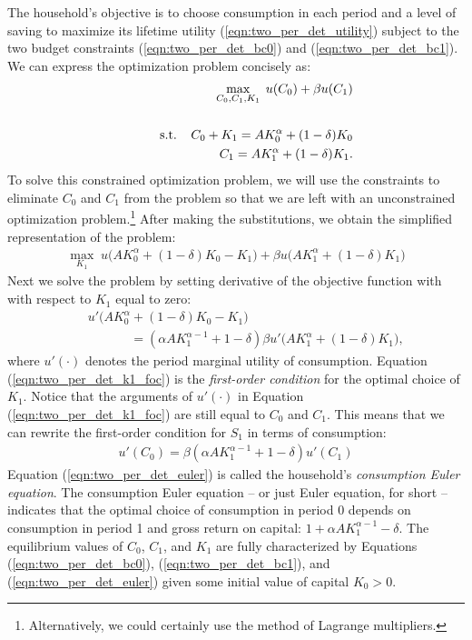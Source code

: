 \documentclass[12pt,fleqn]{article}
\newcommand{\EE}{\begin{eqnarray}}
\newcommand{\FF}{\end{eqnarray}}
\newcommand{\tn}{\textnormal}
\begin{document}
The household's objective is to choose consumption in each period and a level of saving to maximize its lifetime utility (\ref{eqn:two_per_det_utility}) subject to the two budget constraints (\ref{eqn:two_per_det_bc0}) and (\ref{eqn:two_per_det_bc1}). We can express the optimization problem concisely as:
	\EE
	&&\max_{C_0,C_1,K_1} \; u(C_0) + \beta u(C_1)\\\nonumber\\
	&& \; \; \; \;  \; \; \; \; \tn{s.t.} \; \; \; \; C_0 + K_1 = A K_0^{\alpha}  + (1-\delta)K_0\nonumber\\
	&&\; \; \; \; \; \; \; \; \; \; \; \; \; \; \; \; \; C_1 = A K_1^{\alpha}  + (1-\delta)K_1.\nonumber
	\FF
To solve this constrained optimization problem, we will use the constraints to eliminate $C_0$ and $C_1$ from the problem so that we are left with an unconstrained optimization problem.\footnote{Alternatively, we could certainly use the method of Lagrange multipliers.} After making the substitutions, we obtain the simplified representation of the problem:
	\EE
	\max_{K_1} \; u\Big( A K_0^{\alpha}  + (1-\delta)K_0 - K_1 \Big) + \beta u\Big( A K_1^{\alpha}  + (1-\delta)K_1 \Big)
	\FF
Next we solve the problem by setting derivative of the objective function with with respect to $K_1$ equal to zero:
	\EE
	&& u'\Big( A K_0^{\alpha}  + (1-\delta)K_0 - K_1 \Big) \nonumber \\
	&& \; \; \; \; \; \; \; \; \; \; \; \; = \left( \alpha AK_1^{\alpha-1} + 1-\delta\right) \beta u'\Big( A K_1^{\alpha}  + (1-\delta)K_1 \Big) \label{eqn:two_per_det_k1_foc},
	\FF
where $u'(\cdot)$ denotes the period marginal utility of consumption. Equation (\ref{eqn:two_per_det_k1_foc}) is the \emph{first-order condition} for the optimal choice of $K_1$. Notice that the arguments of $u'(\cdot)$ in Equation (\ref{eqn:two_per_det_k1_foc}) are still equal to $C_0$ and $C_1$. This means that we can rewrite the first-order condition for $S_1$ in terms of consumption:
	\EE
	\boxed{u'(C_0) = \beta \left( \alpha AK_1^{\alpha-1} + 1-\delta\right) u'(C_1)} \label{eqn:two_per_det_euler}
	\FF
Equation (\ref{eqn:two_per_det_euler}) is called the household's \emph{consumption Euler equation}. The consumption Euler equation -- or just Euler equation, for short -- indicates that the optimal choice of consumption in period 0 depends on consumption in period 1 and gross return on capital: $1 + \alpha AK_1^{\alpha-1} - \delta$. The equilibrium values of $C_0$, $C_1$, and $K_1$ are fully characterized by Equations (\ref{eqn:two_per_det_bc0}), (\ref{eqn:two_per_det_bc1}), and (\ref{eqn:two_per_det_euler}) given some initial value of capital $K_0>0$.
\end{document}

